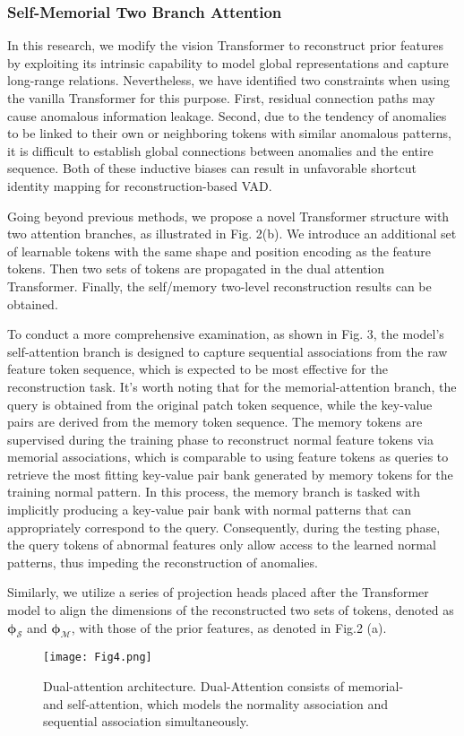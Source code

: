 \documentclass[journal]{IEEEtran}
\begin{document}
\subsubsection{Self-Memorial Two Branch Attention}

In this research, we modify the vision Transformer to reconstruct prior features by exploiting its intrinsic capability to model global representations and capture long-range relations. Nevertheless, we have identified two constraints when using the vanilla Transformer for this purpose. First, residual connection paths may cause anomalous information leakage. Second, due to the tendency of anomalies to be linked to their own or neighboring tokens with similar anomalous patterns, it is difficult to establish global connections between anomalies and the entire sequence. Both of these inductive biases can result in unfavorable shortcut identity mapping for reconstruction-based VAD.

Going beyond previous methods, we propose a novel Transformer structure with two attention branches, as illustrated in Fig. 2(b). We introduce an additional set of learnable tokens with the same shape and position encoding as the feature tokens. Then two sets of tokens are propagated in the dual attention Transformer. Finally, the self/memory two-level reconstruction results can be obtained.

To conduct a more comprehensive examination, as shown in Fig. 3, the model's self-attention branch is designed to capture sequential associations from the raw feature token sequence, which is expected to be most effective for the reconstruction task. It's worth noting that for the memorial-attention branch, the query is obtained from the original patch token sequence, while the key-value pairs are derived from the memory token sequence. The memory tokens are supervised during the training phase to reconstruct normal feature tokens via memorial associations, which is comparable to using feature tokens as queries to retrieve the most fitting key-value pair bank generated by memory tokens for the training normal pattern. In this process, the memory branch is tasked with implicitly producing a key-value pair bank with normal patterns that can appropriately correspond to the query. Consequently, during the testing phase, the query tokens of abnormal features only allow access to the learned normal patterns, thus impeding the reconstruction of anomalies.

Similarly, we utilize a series of projection heads placed after the Transformer model to align the dimensions of the reconstructed two sets of tokens, denoted as $\boldsymbol{\phi_{\mathcal{S}}}$ and $\boldsymbol{\phi_{\mathcal{M}}}$, with those of the prior features, as denoted in Fig.2 (a).
\begin{figure}[t]
\centerline{\texttt{[image: Fig4.png]}}
\caption[width=8.8cm]{Dual-attention architecture. Dual-Attention consists of memorial- and self-attention, which models the normality association and sequential association simultaneously.
}
\label{fig1}
\end{figure}
\end{document}
